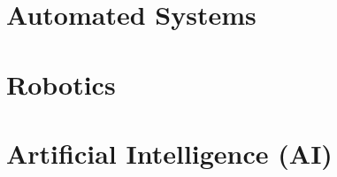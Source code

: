 \documentclass[../main.tex]{subfiles}
\begin{document}
\section{Automated Systems}


\section{Robotics}


\section{Artificial Intelligence (AI)}
\label{6:sec:ai}

\end{document}
